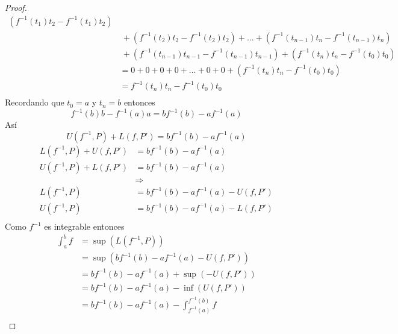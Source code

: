 \documentclass[a4paper]{article}
\begin{document}
\begin{proof}
\begin{align*}
                                                  \left(f^{-1}\left(t_{1}\right)t_{2} - f^{-1}\left(t_{1}\right)t_{2}\right) \\
                                               &\ + \left(f^{-1}\left(t_{2}\right)t_{2} - f^{-1}\left(t_{2}\right)t_{2}\right) + \dotsc + 
                                                  \left(f^{-1}\left(t_{n - 1}\right)t_{n} - f^{-1}\left(t_{n - 1}\right)t_{n}\right) \\
                                               &\ + \left(f^{-1}\left(t_{n - 1}\right)t_{n - 1} - f^{-1}\left(t_{n - 1}\right)t_{n - 1}\right) +
                                                  \left(f^{-1}\left(t_{n}\right)t_{n} - f^{-1}\left(t_{0}\right)t_{0}\right) \\
                                               &= 0 + 0 + 0 + 0 + \dotsc + 0 + 0 + \left(f^{-1}\left(t_{n}\right)t_{n} - f^{-1}\left(t_{0}\right)t_{0}\right) \\
                                               &= f^{-1}\left(t_{n}\right)t_{n} - f^{-1}\left(t_{0}\right)t_{0} \\
\end{align*}
Recordando que \(t_0 = a\) y \(t_{n} = b\) entonces
\[
    f^{-1}\left(b\right)b - f^{-1}\left(a\right)a = bf^{-1}\left(b\right) - af^{-1}\left(a\right) 
\]
Así 
\[
    U\left(f^{-1}, P\right) + L\left(f, P'\right) = bf^{-1}\left(b\right) - af^{-1}\left(a\right) 
\]
\begin{align*}
    L\left(f^{-1}, P\right) + U\left(f, P'\right) &= bf^{-1}\left(b\right) - af^{-1}\left(a\right) \\
    U\left(f^{-1}, P\right) + L\left(f, P'\right) &= bf^{-1}\left(b\right) - af^{-1}\left(a\right) \\
                                                  &\Rightarrow  \\
    L\left(f^{-1}, P\right) &= bf^{-1}\left(b\right) - af^{-1}\left(a\right) - U\left(f, P'\right) \\
    U\left(f^{-1}, P\right) &= bf^{-1}\left(b\right) - af^{-1}\left(a\right) - L\left(f, P'\right) \\
\end{align*}
Como \(f^{-1}\) es integrable entonces
\begin{align*}
    \int_{a}^{b} f &= \sup{\left(L\left(f^{-1}, P\right)\right)} \\
                   &= \sup{\left(bf^{-1}\left(b\right) - af^{-1}\left(a\right) - U\left(f, P'\right)\right)} \\
                   &= bf^{-1}\left(b\right) - af^{-1}\left(a\right) + \sup{\left(- U\left(f, P'\right)\right)} \\
                   &= bf^{-1}\left(b\right) - af^{-1}\left(a\right) - \inf{\left(U\left(f, P'\right)\right)} \\
                   &= bf^{-1}\left(b\right) - af^{-1}\left(a\right) - \int_{f^{-1}(a)}^{f^{-1}(b)} f \\
\end{align*}
\end{proof}
\end{document}
